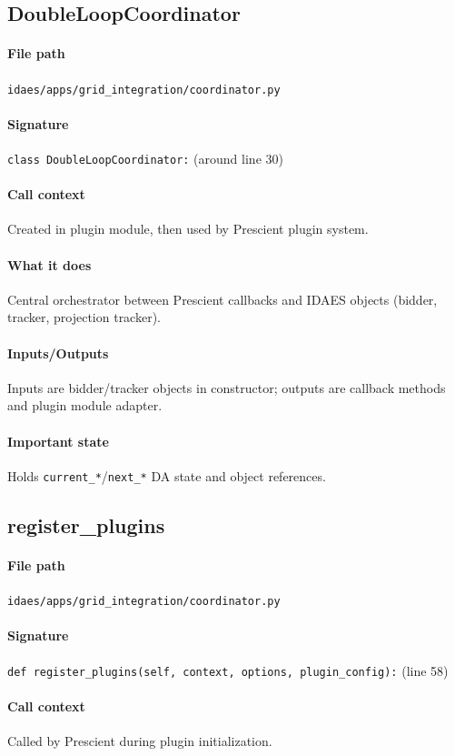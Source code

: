 \documentclass{article}
\begin{document}
\subsection{DoubleLoopCoordinator}\label{fn:DoubleLoopCoordinator}
\paragraph{File path} \texttt{idaes/apps/grid\_integration/coordinator.py}
\paragraph{Signature} \texttt{class DoubleLoopCoordinator:} (around line 30)
\paragraph{Call context} Created in plugin module, then used by Prescient plugin system.
\paragraph{What it does} Central orchestrator between Prescient callbacks and IDAES objects (bidder, tracker, projection tracker).
\paragraph{Inputs/Outputs} Inputs are bidder/tracker objects in constructor; outputs are callback methods and plugin module adapter.
\paragraph{Important state} Holds \texttt{current\_*}/\texttt{next\_*} DA state and object references.

\subsection{register\_plugins}\label{fn:register_plugins}
\paragraph{File path} \texttt{idaes/apps/grid\_integration/coordinator.py}
\paragraph{Signature} \texttt{def register\_plugins(self, context, options, plugin\_config):} (line 58)
\paragraph{Call context} Called by Prescient during plugin initialization.
\end{document}
